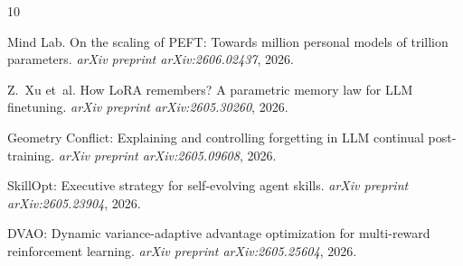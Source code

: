 \documentclass[11pt,a4paper]{article}
\begin{document}

\begin{thebibliography}{10}

Mind Lab.
\newblock On the scaling of {PEFT}: Towards million personal models of trillion parameters.
\newblock \emph{arXiv preprint arXiv:2606.02437}, 2026.

Z.~Xu et~al.
\newblock How {LoRA} remembers? {A} parametric memory law for {LLM} finetuning.
\newblock \emph{arXiv preprint arXiv:2605.30260}, 2026.

Geometry Conflict: Explaining and controlling forgetting in {LLM} continual post-training.
\newblock \emph{arXiv preprint arXiv:2605.09608}, 2026.

SkillOpt: Executive strategy for self-evolving agent skills.
\newblock \emph{arXiv preprint arXiv:2605.23904}, 2026.

DVAO: Dynamic variance-adaptive advantage optimization for multi-reward reinforcement learning.
\newblock \emph{arXiv preprint arXiv:2605.25604}, 2026.

\end{thebibliography}
\end{document}

